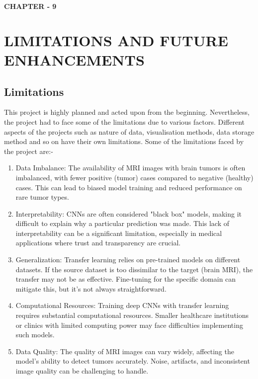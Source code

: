 \newpage
\begin{center}
    \textbf{\LARGE CHAPTER - 9}
\end{center}


\section{LIMITATIONS AND FUTURE ENHANCEMENTS}
\subsection{Limitations}
This project is highly planned and acted upon from the beginning. Nevertheless, the project had to face some of the limitations due to various factors. Different aspects of the projects such as nature of data, visualisation methods, data storage method and so on have their own limitations. Some of the limitations faced by the project are:-

\begin{enumerate}
  \setlength\itemsep{1.5em}
	\item Data Imbalance: The availability of MRI images with brain tumors is often imbalanced, with fewer positive (tumor) cases compared to negative (healthy) cases. This can lead to biased model training and reduced performance on rare tumor types.
	\item Interpretability: CNNs are often considered "black box" models, making it difficult to explain why a particular prediction was made. This lack of interpretability can be a significant limitation, especially in medical applications where trust and transparency are crucial.
	\item  Generalization: Transfer learning relies on pre-trained models on different datasets. If the source dataset is too dissimilar to the target (brain MRI), the transfer may not be as effective. Fine-tuning for the specific domain can mitigate this, but it's not always straightforward.
	\item  Computational Resources: Training deep CNNs with transfer learning requires substantial computational resources. Smaller healthcare institutions or clinics with limited computing power may face difficulties implementing such models.
	\item Data Quality: The quality of MRI images can vary widely, affecting the model's ability to detect tumors accurately. Noise, artifacts, and inconsistent image quality can be challenging to handle.
\end{enumerate}

